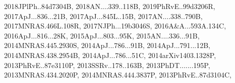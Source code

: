 \documentclass[12pt]{article}
\begin{document}
\begin{enumerate}
\begin{enumerate}
{2018JPlPh..84d7304B,%
2018AN....339..118B,%
2019PhRvE..99d3206R,%
2017ApJ...836...21B,%
2017ApJ...845L..15B,%
2017AN....338..790B,%
2017MNRAS.466L.108R,%
2017NJPh...19b3046S,%
2016A&A...593A.134C,%
2016ApJ...816...28K,%
2015ApJ...803...95K,%
2015AN....336...91B,%
2014MNRAS.445.2930S,%
2014ApJ...786...91B,%
2014ApJ...791...12B,%
2014MNRAS.438.2954B,%
2014ApJ...786...51C,%
2014arXiv1403.1328P,%
2013PhRvE..87e3110P,%
2013SSRv..178..163B,%
2013PhDT.......195P,%
2013MNRAS.434.2020P,%
2014MNRAS.444.3837P,%
2013PhRvE..87d3104C,%
}
\end{enumerate}
\end{enumerate}
\end{document}
